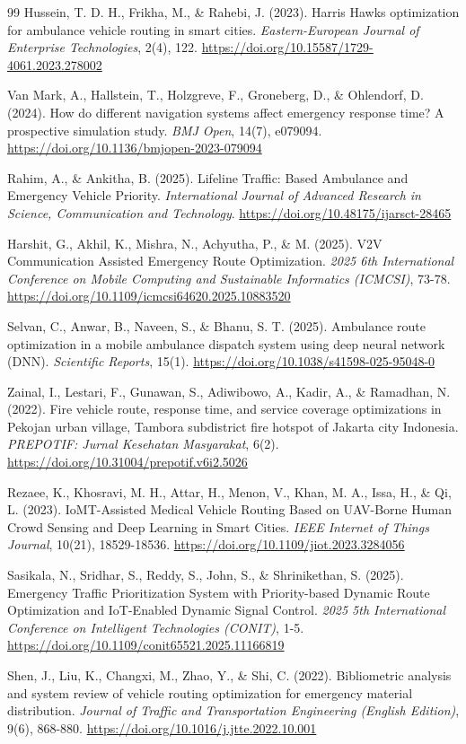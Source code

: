\documentclass[paper=A4, 12pt, mathscr]{report}
\begin{document}
\begin{thebibliography}{99}
		 Hussein, T. D. H., Frikha, M., \& Rahebi, J. (2023). Harris Hawks optimization for ambulance vehicle routing in smart cities. \textit{Eastern-European Journal of Enterprise Technologies}, 2(4), 122. \url{https://doi.org/10.15587/1729-4061.2023.278002}
		
		 Van Mark, A., Hallstein, T., Holzgreve, F., Groneberg, D., \& Ohlendorf, D. (2024). How do different navigation systems affect emergency response time? A prospective simulation study. \textit{BMJ Open}, 14(7), e079094. \url{https://doi.org/10.1136/bmjopen-2023-079094}
		
		 Rahim, A., \& Ankitha, B. (2025). Lifeline Traffic: Based Ambulance and Emergency Vehicle Priority. \textit{International Journal of Advanced Research in Science, Communication and Technology}. \url{https://doi.org/10.48175/ijarsct-28465}
		
		 Harshit, G., Akhil, K., Mishra, N., Achyutha, P., \& M. (2025). V2V Communication Assisted Emergency Route Optimization. \textit{2025 6th International Conference on Mobile Computing and Sustainable Informatics (ICMCSI)}, 73-78. \url{https://doi.org/10.1109/icmcsi64620.2025.10883520}
		
		 Selvan, C., Anwar, B., Naveen, S., \& Bhanu, S. T. (2025). Ambulance route optimization in a mobile ambulance dispatch system using deep neural network (DNN). \textit{Scientific Reports}, 15(1). \url{https://doi.org/10.1038/s41598-025-95048-0}
		
		 Zainal, I., Lestari, F., Gunawan, S., Adiwibowo, A., Kadir, A., \& Ramadhan, N. (2022). Fire vehicle route, response time, and service coverage optimizations in Pekojan urban village, Tambora subdistrict fire hotspot of Jakarta city Indonesia. \textit{PREPOTIF: Jurnal Kesehatan Masyarakat}, 6(2). \url{https://doi.org/10.31004/prepotif.v6i2.5026}
		
		 Rezaee, K., Khosravi, M. H., Attar, H., Menon, V., Khan, M. A., Issa, H., \& Qi, L. (2023). IoMT-Assisted Medical Vehicle Routing Based on UAV-Borne Human Crowd Sensing and Deep Learning in Smart Cities. \textit{IEEE Internet of Things Journal}, 10(21), 18529-18536. \url{https://doi.org/10.1109/jiot.2023.3284056}
		
		 Sasikala, N., Sridhar, S., Reddy, S., John, S., \& Shrinikethan, S. (2025). Emergency Traffic Prioritization System with Priority-based Dynamic Route Optimization and IoT-Enabled Dynamic Signal Control. \textit{2025 5th International Conference on Intelligent Technologies (CONIT)}, 1-5. \url{https://doi.org/10.1109/conit65521.2025.11166819}
		
		 Shen, J., Liu, K., Changxi, M., Zhao, Y., \& Shi, C. (2022). Bibliometric analysis and system review of vehicle routing optimization for emergency material distribution. \textit{Journal of Traffic and Transportation Engineering (English Edition)}, 9(6), 868-880. \url{https://doi.org/10.1016/j.jtte.2022.10.001}
		
		
	\end{thebibliography}
\end{document}
